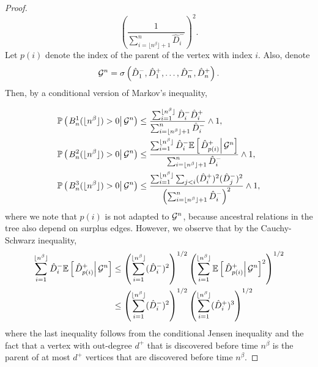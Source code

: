 \begin{proof}
$$\left(\frac{1}{\sum_{i=\lfloor n^\beta \rfloor+1}^n \hat{D}^-_i}\right)^2.$$
Let $p(i)$ denote the index of the parent of the vertex with index $i$. Also, denote $${\mathcal G}^n=\sigma\left(\hat{D}^-_1,\hat{D}^+_1,\dots,\hat{D}^-_n,\hat{D}^+_n \right).$$ Then, by a conditional version of Markov's inequality, 

\begin{align*}{\mathbb P}\left(\left.B^1_n(\lfloor n^\beta \rfloor)>0\right| {\mathcal G}^n \right)&\leq \frac{\sum_{i=1}^{\lfloor n^\beta \rfloor} \hat{D}^-_i\hat{D}^+_i}{\sum_{i=\lfloor n^\beta \rfloor+1}^n \hat{D}^-_i}\wedge 1,\\
{\mathbb P}\left(\left.B^2_n(\lfloor n^\beta \rfloor)>0\right| {\mathcal G}^n \right)&\leq \frac{\sum_{i=1}^{\lfloor n^\beta \rfloor} \hat{D}^-_i{\mathbb E}\left[\left.\hat{D}^+_{p(i)}\right|{\mathcal G}^n\right]}{\sum_{i=\lfloor n^\beta \rfloor+1}^n \hat{D}^-_i}\wedge 1,\\
{\mathbb P}\left(\left.B^3_n(\lfloor n^\beta \rfloor)>0\right| {\mathcal G}^n \right)&\leq \frac{\sum_{i=1}^{\lfloor n^\beta \rfloor}\sum_{j<i} (\hat{D}^+_i)^2 (\hat{D}^-_j)^2 }{\left(\sum_{i=\lfloor n^\beta \rfloor+1}^n \hat{D}^-_i\right)^2 }\wedge 1,\end{align*}
where we note that $p(i)$ is not adapted to ${\mathcal G}^n$, because ancestral relations in the tree also depend on surplus edges. However, we observe that by the Cauchy-Schwarz inequality,
\begin{align*}\sum_{i=1}^{\lfloor n^\beta \rfloor} \hat{D}^-_i{\mathbb E}\left[\left.\hat{D}^+_{p(i)}\right|{\mathcal G}^n\right]&\leq \left(\sum_{i=1}^{\lfloor n^\beta \rfloor} (\hat{D}^-_i)^2\right)^{1/2}\left(\sum_{i=1}^{\lfloor n^\beta \rfloor} {\mathbb E}\left[\left.\hat{D}^+_{p(i)}\right|{\mathcal G}^n\right]^2\right)^{1/2}\\
&\leq\left(\sum_{i=1}^{\lfloor n^\beta \rfloor} (\hat{D}^-_i)^2\right)^{1/2}\left(\sum_{i=1}^{\lfloor n^\beta \rfloor} (\hat{D}^+_i)^3\right)^{1/2}\end{align*}
where the last inequality follows from the conditional Jensen inequality and the fact that a vertex with out-degree $d^+$ that is discovered before time $n^\beta$ is the parent of at most $d^+$ vertices that are discovered before time $n^\beta$.


\end{proof}
